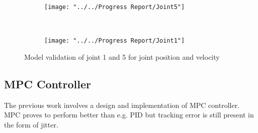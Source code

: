 \begin{figure}
	\centering
	\begin{subfigure}[b]{0.4\textwidth}
		\texttt{[image: "../../Progress Report/Joint5"]}
		\caption{}
		\label{fig:Joint5}
	\end{subfigure}%
	~ %
	\begin{subfigure}[b]{0.4\textwidth}
		\texttt{[image: "../../Progress Report/Joint1"]}
		\caption{}
		\label{fig:Joint1}
	\end{subfigure}
	\caption{Model validation of joint 1 and 5 for joint position and velocity}\label{fig:idenJoint}
\end{figure}

\subsection{\ac{MPC} Controller}
The previous work involves a design and implementation of \ac {MPC} controller. \ac {MPC} proves to perform better than e.g. \ac{PID} but tracking error is still present in the form of jitter.

